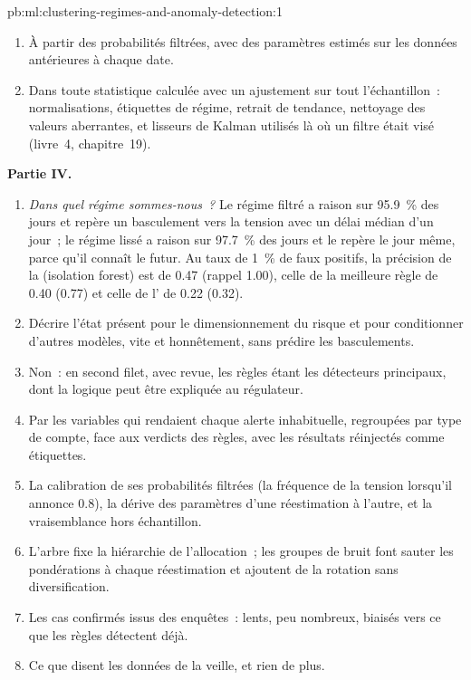 \begin{solution}{pb:ml:clustering-regimes-and-anomaly-detection:1}
\begin{enumerate}[resume]
\item À partir des probabilités filtrées, avec des paramètres estimés sur les données antérieures à chaque date.
\item Dans toute statistique calculée avec un ajustement sur tout l'échantillon~: normalisations, étiquettes de régime, retrait de tendance, nettoyage des valeurs aberrantes, et
lisseurs de Kalman utilisés là où un filtre était visé (livre~4, chapitre~19).
\end{enumerate}
\textbf{Partie IV.}
\begin{enumerate}[resume]
\item \emph{Dans quel régime sommes-nous~?} Le régime filtré a raison sur 95.9~\% des jours et repère un basculement vers la tension avec un délai médian
d'un jour~; le régime lissé a raison sur 97.7~\% des jours et le repère le jour même, parce qu'il connaît le futur. Au taux de 1~\% de faux
positifs, la précision de la  (isolation forest) est de 0.47 (rappel 1.00), celle de la meilleure règle de 0.40 (0.77) et celle de l' de 0.22 (0.32).
\item Décrire l'état présent pour le dimensionnement du risque et pour conditionner d'autres modèles, vite et honnêtement, sans prédire
les basculements.
\item Non~: en second filet, avec revue, les règles étant les détecteurs principaux, dont la logique peut être expliquée au régulateur.
\item Par les variables qui rendaient chaque alerte inhabituelle, regroupées par type de compte, face aux verdicts des règles, avec les résultats
réinjectés comme étiquettes.
\item La calibration de ses probabilités filtrées (la fréquence de la tension lorsqu'il annonce 0.8), la dérive des paramètres d'une réestimation à l'autre, et
la vraisemblance hors échantillon.
\item L'arbre fixe la hiérarchie de l'allocation~; les groupes de bruit font sauter les pondérations à chaque réestimation et ajoutent de la rotation
sans diversification.
\item Les cas confirmés issus des enquêtes~: lents, peu nombreux, biaisés vers ce que les règles détectent déjà.
\item Ce que disent les données de la veille, et rien de plus.
\end{enumerate}
\end{solution}


